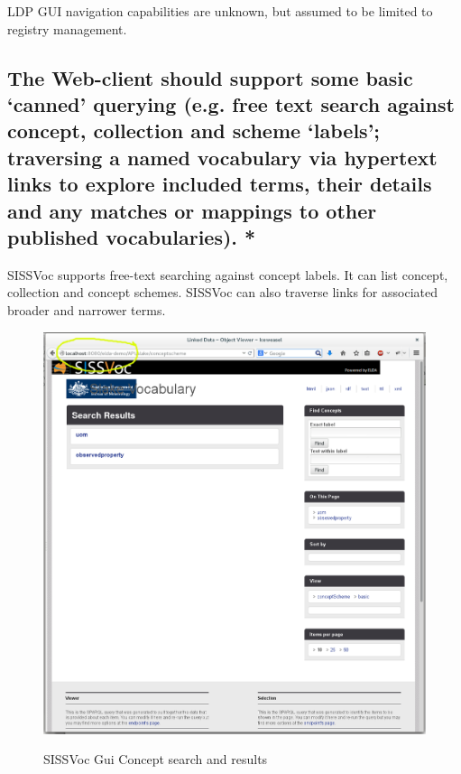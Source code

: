 \documentclass[10pt,a4paper]{article}
\begin{document}
\begin{flushleft}
{LDP GUI navigation capabilities are unknown, but assumed to be limited to 
registry management.
}
%
%
\subsection{ The Web-client should support some basic ‘canned’ querying (e.g.
free text search against concept, collection and scheme ‘labels’; traversing a
named vocabulary via hypertext links to explore included terms, their details
and any matches or mappings to other published vocabularies). * }
%
SISSVoc supports free-text searching against concept labels. It can list
concept, collection and concept schemes. SISSVoc can also traverse links 
for associated broader and narrower terms. 

\begin{figure}[H]
\centering
\caption{SISSVoc Gui Concept search and results}
\includegraphics[width=12cm]{sissvoc}  
\label{fig:test}
\end{figure}



% 


\end{flushleft}
\end{document}
